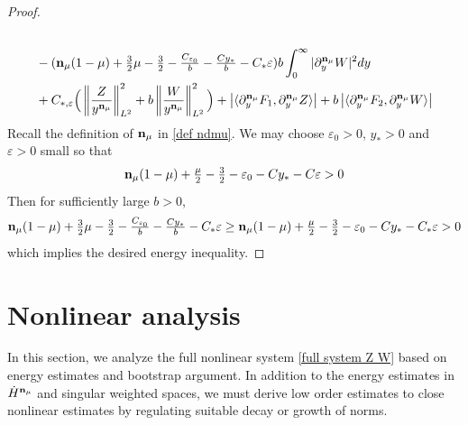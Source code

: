 \documentclass{article}
\newcommand{\norm}[1]{\left\lVert#1\right\rVert}
\newcommand{\pa}{\partial}
\newcommand\eps{\varepsilon}
\def\espz{Z}
\def\espw{W}
\def\ndmu{{\bf{n}_{\mu}}}
\numberwithin{equation}{section}
\begin{document}
\begin{proof}
\begin{align*}
\\
&\quad -  ( \ndmu(1- \mu) + \tfrac32 
\mu  -\tfrac32 - \tfrac{C_{\eps_0}}{b} - \tfrac{C y_*}{b} - C_*\eps ) b \int_0^\infty |\pa_y^\ndmu \espw|^2 dy \\
& \quad + C_{*, \eps} \Big(  \norm{\frac{\espz}{y^{\ndmu}}}_{L^2}^2 + b  \norm{\frac{\espw}{y^{\ndmu}}}_{L^2}^2\Big) + \left|\langle \pa_y^\ndmu F_1, \pa_y^\ndmu \espz \rangle \right| +b \left|\langle \pa_y^\ndmu F_2, \pa_y^\ndmu \espw \rangle \right|
\end{align*}
  Recall the definition of $\ndmu$ in \eqref{def ndmu}. We may choose $\eps_0>0$, $y_*>0$ and $\eps>0$ small so that 
  \[
 \ndmu (1-\mu) + \tfrac{\mu}{2} - \tfrac32 -\eps_0 - C y_* - C\eps >0  
    \]
Then for sufficiently large $b>0$,  
    \[
    \ndmu(1- \mu) + \tfrac32 
\mu  -\tfrac32 - \tfrac{C_{\eps_0}}{b} - \tfrac{C y_*}{b} - C_*\eps \ge \ndmu (1-\mu) + \tfrac{\mu}{2} - \tfrac32 -\eps_0 - C y_* - C_*\eps >0  
    \]
    which implies the desired energy inequality. 
\end{proof}

\section{Nonlinear analysis}\label{section 5}




In this section, we analyze the full nonlinear system \eqref{full system Z W} based on energy estimates and bootstrap argument. In addition to the energy  estimates in $\dot H^\ndmu$ and singular weighted spaces, we must derive low order estimates to close nonlinear estimates by regulating suitable decay or growth of norms. 
\end{document}
